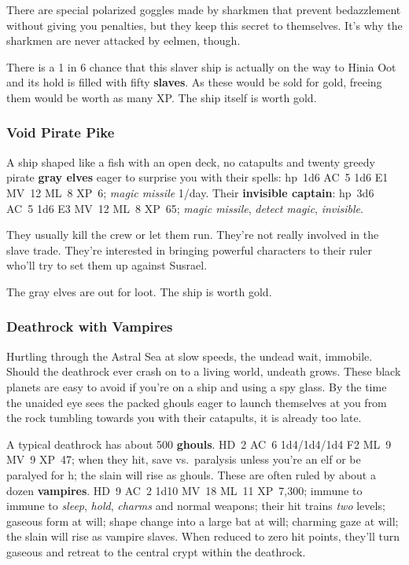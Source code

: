 \documentclass[11pt]{bxart}
\begin{document}
There are special polarized goggles made by sharkmen that prevent
bedazzlement without giving you penalties, but they keep this secret
to themselves. It's why the sharkmen are never attacked by eelmen,
though.

There is a 1 in 6 chance that this slaver ship is actually on the way
to Hinia Oot and its hold is filled with fifty \textbf{slaves}. As
these would be sold for \unit[25,000]{gold}, freeing them would be worth as
many XP. The ship itself is worth \unit[50,000]{gold}.

\subsubsection{Void Pirate Pike}

A ship shaped like a fish with an open deck, no catapults and twenty
greedy pirate \textbf{gray elves} eager to surprise you with their
spells: hp~1d6 AC~5 1d6 E1 MV~12 ML~8 XP~6; \emph{magic missile}
1/day. Their \textbf{invisible captain}: hp~3d6 AC~5 1d6 E3 MV~12 ML~8
XP~65; \emph{magic missile}, \emph{detect magic}, \emph{invisible}.

They usually kill the crew or let them run. They're not really
involved in the slave trade. They're interested in bringing powerful
characters to their ruler who'll try to set them up against Susrael.

The gray elves are out for loot. The ship is worth \unit[20,000]{gold}.

\subsubsection{Deathrock with Vampires}

Hurtling through the Astral Sea at slow speeds, the undead wait,
immobile. Should the deathrock ever crash on to a living world,
undeath grows. These black planets are easy to avoid if you're on a
ship and using a spy glass. By the time the unaided eye sees the
packed ghouls eager to launch themselves at you from the rock tumbling
towards you with their catapults, it is already too late.

A typical deathrock has about 500 \textbf{ghouls}. HD~2 AC~6
1d4/1d4/1d4 F2 ML~9 MV~9 XP~47; when they hit, save vs.~paralysis
unless you're an elf or be paralyed for \unit[1]{h}; the slain will
rise as ghouls. These are often ruled by about a dozen
\textbf{vampires}. HD~9 AC~2 1d10 MV~18 ML~11 XP~7,300; immune to
immune to \textit{sleep}, \textit{hold}, \textit{charms} and normal
weapons; their hit trains \emph{two} levels; gaseous form at will;
shape change into a large bat at will; charming gaze at will; the
slain will rise as vampire slaves. When reduced to zero hit points,
they'll turn gaseous and retreat to the central crypt within the
deathrock.
\end{document}
